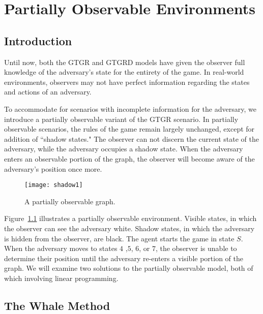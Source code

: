 %
%


\chapter{Partially Observable Environments}

\section{Introduction}
Until now, both the GTGR and GTGRD models have given the observer full knowledge of the adversary's state for the entirety of the game. In real-world environments, observers may not have perfect information regarding the states and actions of an adversary. 


To accommodate for scenarios with incomplete information for the adversary, we introduce a partially observable variant of the GTGR scenario. In partially observable scenarios, the rules of the game remain largely unchanged, except for addition of “shadow states." The observer can not discern the current state of the adversary, while the adversary occupies a shadow state. When the adversary enters an observable portion of the graph, the observer will become aware of the adversary's position once more.

\begin{figure}[h!]
\begin{center}

  \texttt{[image: shadow1]}
  \end{center}

  \caption{A partially observable graph.}
  \label{fig:shadow1}
\end{figure}

Figure~\ref{fig:shadow1} illustrates a partially observable environment. Visible states, in which the observer can see the adversary  white. Shadow states, in which the adversary is hidden from the observer, are black. The agent starts the game in state $S$. When the adversary moves to states $4$ ,$5$, $6$, or $7$, the observer is unable to determine their position until the adversary re-enters a visible portion of the graph.  
We will examine two solutions to the partially observable model, both of which involving linear programming. 

\section{The Whale Method}

